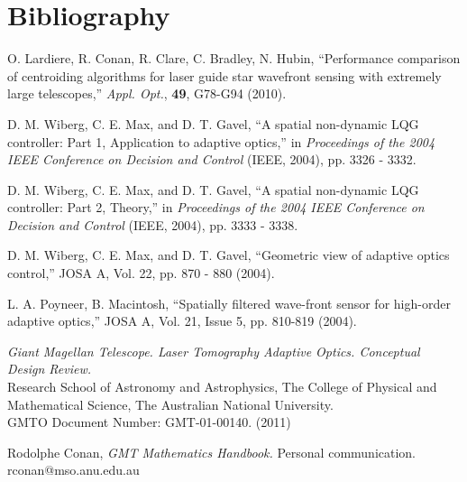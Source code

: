 
\newpage
\section{Bibliography}
\label{sec:biblio}

\begin{thebibliography}{}

O. Lardiere, R. Conan, R. Clare, C. Bradley, N. Hubin,
``Performance comparison of centroiding algorithms for laser guide star
wavefront sensing with extremely large telescopes,'' \emph{Appl. Opt.},
\textbf{49}, G78-G94 (2010).

D. M. Wiberg, C. E. Max, and D. T. Gavel, ``A spatial
non-dynamic LQG controller: Part 1, Application to
adaptive optics,'' in \emph{Proceedings of the 2004 IEEE
Conference on Decision and Control} (IEEE, 2004), pp.
3326 - 3332.

D. M. Wiberg, C. E. Max, and D. T. Gavel, ``A spatial
non-dynamic LQG controller: Part 2, Theory,'' in
\emph{Proceedings of the 2004 IEEE Conference on Decision and
Control} (IEEE, 2004), pp. 3333 - 3338.

D. M. Wiberg, C. E. Max, and D. T. Gavel, ``Geometric view of adaptive optics
control,'' JOSA A, Vol. 22, pp. 870 - 880 (2004).

L. A. Poyneer, B. Macintosh,
``Spatially filtered wave-front sensor for high-order adaptive optics,''
JOSA A, Vol. 21, Issue 5, pp. 810-819 (2004).

\emph{Giant Magellan Telescope. Laser Tomography Adaptive Optics. Conceptual
Design Review.} \\
Research School of Astronomy and Astrophysics, The College of
Physical and Mathematical Science, The Australian National University. \\
GMTO Document Number: GMT-01-00140. (2011)

Rodolphe Conan, \emph{GMT Mathematics Handbook.} Personal communication. \\
rconan@mso.anu.edu.au

\end{thebibliography}
